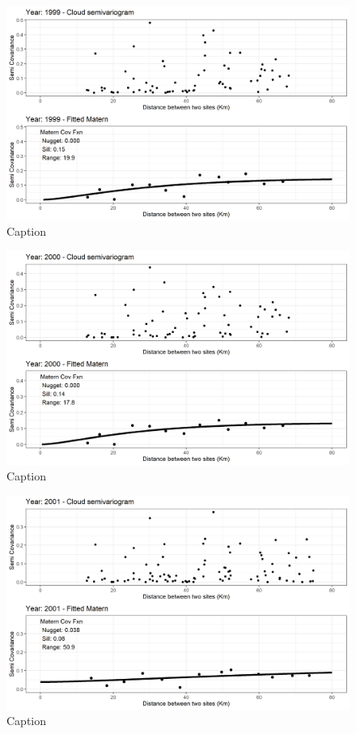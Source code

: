 \begin{figure}
    \centering
    \includegraphics{Figures/EmpiricalVariograms/Empirical_Variogram_1999.png}
    \caption{Caption}
    \label{fig:my_label}
\end{figure}

\begin{figure}
    \centering
    \includegraphics{Figures/EmpiricalVariograms/Empirical_Variogram_2000.png}
    \caption{Caption}
    \label{fig:my_label}
\end{figure}

\begin{figure}
    \centering
    \includegraphics{Figures/EmpiricalVariograms/Empirical_Variogram_2001.png}
    \caption{Caption}
    \label{fig:my_label}
\end{figure}

